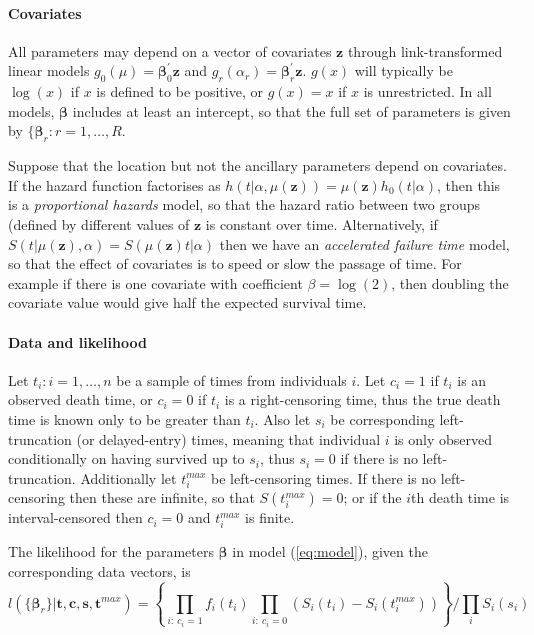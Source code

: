 \documentclass[nojss,nofooter]{jss}
\begin{document}
\paragraph{Covariates} 

All parameters may depend on a vector of covariates $\mathbf{z}$
through link-transformed linear models $g_0(\mu) = \bm{\beta}_0^{'}
\mathbf{z}$ and $g_r(\alpha_r) = \bm{\beta}_r^{'} \mathbf{z}$. $g(x)$ will
typically be $\log(x)$ if $x$ is defined to be positive, or $g(x)=x$
if $x$ is unrestricted.  In all models, $\bm{\beta}$ includes at 
least an intercept, so that the full set of parameters is given by 
$\{\bm{\beta}_r: r=1,\ldots,R$.

Suppose that the location but not the ancillary parameters depend on
covariates.  If the hazard function factorises as $h(t | \alpha,
\mu(\mathbf{z})) = \mu(\mathbf{z}) h_0(t | \alpha)$, then this is a
\emph{proportional hazards} model, so that the hazard ratio between
two groups (defined by different values of $\mathbf{z}$ is constant
over time.  Alternatively, if $S(t | \mu(\mathbf{z}), \alpha) =
S(\mu(\mathbf{z}) t | \alpha)$ then we have an \emph{accelerated
  failure time} model, so that the effect of covariates is to speed or
slow the passage of time. For example if there is one covariate with
coefficient $\beta=\log(2)$, then doubling the covariate value would
give half the expected survival time.


\paragraph{Data and likelihood} 

Let $t_i: i=1,\ldots, n$ be a sample of times from individuals $i$.
Let $c_i=1$ if $t_i$ is an observed death time, or $c_i=0$ if $t_i$ is
a right-censoring time, thus the true death time is known only to be
greater than $t_i$.  Also let $s_i$ be corresponding left-truncation
(or delayed-entry) times, meaning that individual $i$ is only observed
conditionally on having survived up to $s_i$, thus $s_i=0$ if there is
no left-truncation.  Additionally let $t^{max}_i$ be left-censoring
times.  If there is no left-censoring then these are infinite, so that
$S(t^{max}_i)=0$; or if the $i$th death time is interval-censored then
$c_i=0$ and $t^{max}_i$ is finite.

The likelihood for the parameters $\bm{\beta}$ in model
(\ref{eq:model}), given the corresponding data vectors, is
\begin{equation}
  \label{eq:lik}
  l(\{\bm{\beta}_r\} | \mathbf{t},\mathbf{c},\mathbf{s},\mathbf{t}^{max}) = \left\{ \prod_{i:\ c_i=1} f_i(t_i) \prod_{i:\ c_i=0} \left(S_i(t_i) - S_i(t^{max}_i)\right)\right\} / \prod_i S_i(s_i)  
\end{equation}
\end{document}
